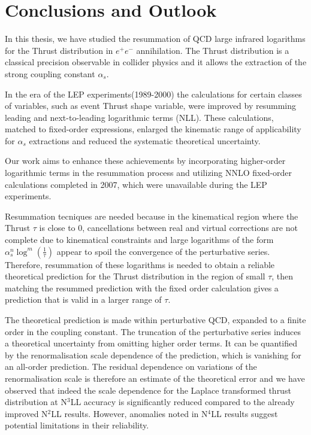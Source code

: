 \documentclass[../Tesi_Jiahao_Miao_986136.tex]{subfiles}
\begin{document}
\chapter{Conclusions and Outlook}\label{ch:conclusioni}

In this thesis, we have studied the resummation of QCD large infrared logarithms for the Thrust distribution in $e^+e^-$ annihilation.
The Thrust distribution is a classical precision observable in collider physics and it allows the extraction of the strong coupling constant $\alpha_s$.

In the era of the LEP experiments(1989-2000) the calculations for certain classes of variables, such as event Thrust shape variable, 
were improved by resumming leading and next-to-leading logarithmic terms (NLL). These calculations, matched to fixed-order expressions, enlarged the
kinematic range of applicability for $\alpha_s$ extractions and reduced the systematic theoretical uncertainty. 

Our work aims to enhance these achievements by incorporating higher-order logarithmic terms in the resummation process and utilizing NNLO fixed-order calculations completed in 2007, 
which were unavailable during the LEP experiments.

Resummation tecniques are needed because in the kinematical region where the Thrust $\tau$ is close to 0, cancellations between real and virtual corrections 
are not complete due to kinematical constraints and large logarithms of the form $\alpha_s^n \log^m(\frac{1}{\tau})$ appear to spoil the convergence of the perturbative series.
Therefore, resummation of these logarithms is needed to obtain a reliable theoretical prediction for the Thrust distribution in the region of small $\tau$, 
then matching the resummed prediction with the fixed order calculation gives a prediction that is valid in a larger range of $\tau$.

The theoretical prediction is made within perturbative QCD, expanded to a finite order in the coupling constant.
The truncation of the perturbative series induces a theoretical uncertainty from omitting higher order terms.
It can be quantified by the renormalisation scale dependence of the prediction, which is vanishing for an all-order prediction.
The residual dependence on variations of the renormalisation scale is therefore an estimate of the theoretical error and we have 
observed that indeed the scale dependence for the Laplace transformed thrust distribution at N$^3$LL accuracy is significantly reduced compared to the already 
improved N$^2$LL results. However, anomalies noted in N$^4$LL results suggest potential limitations in their reliability.
\end{document}
